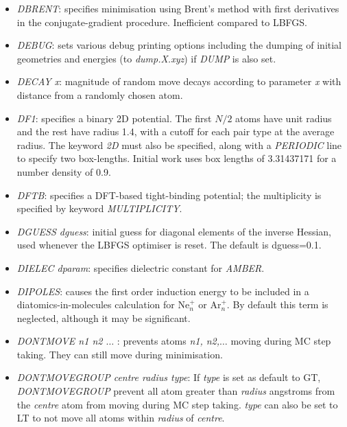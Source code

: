 \documentclass[12pt,a4paper,dvips]{article}
\begin{document}
\begin{itemize}
\item {\it DBRENT}: specifies minimisation using Brent's method with first derivatives in the
conjugate-gradient procedure. 
Inefficient compared to LBFGS.

\item {\it DEBUG\/}: sets various debug printing options including the dumping of initial
geometries and energies (to {\it dump.X.xyz\/}) if {\it DUMP} is also set.

\item {\it DECAY x\/}: magnitude of random move decays according to parameter
{\it x\/} with distance from a randomly chosen atom.

\item {\it DF1\/}: specifies a binary 2D potential.
The first $N/2$ atoms have unit radius and the rest
have radius 1.4, with a cutoff for each pair type at the
average radius.
The keyword {\it 2D\/} must also be specified, along with a
{\it PERIODIC\/} line to specify two box-lengths.
Initial work uses box lengths of 3.31437171 for a number density of 0.9.

\item {\it DFTB\/}: specifies a DFT-based tight-binding potential; the multiplicity is specified by
keyword {\it MULTIPLICITY\/}.

\item {\it DGUESS dguess\/}: initial guess for diagonal elements of the inverse
      Hessian, used whenever the LBFGS optimiser is reset. 
      The default is dguess=0.1.

\item {\it DIELEC dparam\/}: specifies dielectric constant for {\it AMBER\/}.

\item {\it DIPOLES\/}: causes the first order induction energy to be included
in a diatomics-in-molecules calculation for Ne$^+_n$ or Ar$^+_n$. By default this
term is neglected, although it may be significant.

\item {\it DONTMOVE n1 n2 $\ldots$ \/}: prevents atoms {\it n1, n2,$\ldots$} moving during MC step taking. They can still move during minimisation.

\item {\it DONTMOVEGROUP centre radius type\/}: If {\it type} is set as default to {\textrm GT}, {\it DONTMOVEGROUP\/} prevent all atom greater than {\it radius} angstroms from the {\it centre} atom from moving during MC step taking. {\it type} can also be set to LT to not move all atoms within {\it radius} of {\it centre}.


\end{itemize}
\end{document}
